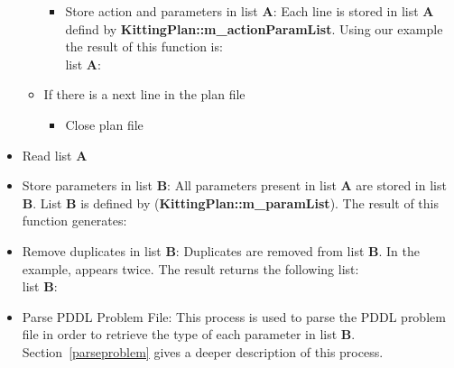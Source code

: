 \begin{itemize}
\begin{itemize}
\begin{itemize}
\item Store action and parameters in list \textbf{A}: Each line is stored in list \textbf{A} defind by \textbf{\small{KittingPlan::m\_actionParamList}}. Using our example the result of this function is:\\
    list \textbf{A}: \small{}
\end{itemize}
\item If there is a next line in the plan file
\begin{itemize}
\item Close plan file
\end{itemize}
\end{itemize}
\item Read list \textbf{A}
\item Store parameters in list \textbf{B}: All parameters present in list \textbf{A} are stored in list \textbf{B}. List \textbf{B} is defined by (\textbf{\small{KittingPlan::m\_paramList}}). The result of this function generates:\\ \small{}
\item Remove duplicates in list \textbf{B}: Duplicates are removed from list \textbf{B}. In the example,  appears twice. The result returns the following list:\\
    list \textbf{B}: \small{}
\item Parse PDDL Problem File: This process is used to parse the PDDL problem file in order to retrieve the type of each parameter in list \textbf{B}. Section~\ref{parseproblem} gives a deeper description of this process.
\end{itemize}

\newpage
